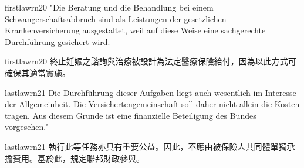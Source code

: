 \documentclass[12pt]{article}
\begin{document}
\begin{sourceboxpara}[title={原文理由 A.I.3 引文}]
\begin{lawboxpart}{first}{lawrn20}
"Die Beratung und die Behandlung bei einem Schwangerschaftsabbruch sind als Leistungen der gesetzlichen Krankenversicherung ausgestaltet, weil auf diese Weise eine sachgerechte Durchführung gesichert wird.
\end{lawboxpart}
\end{sourceboxpara}
\begin{transboxpara}
\begin{lawboxpart}{first}{lawrn20}
終止妊娠之諮詢與治療被設計為法定醫療保險給付，因為以此方式可確保其適當實施。
\end{lawboxpart}
\end{transboxpara}
\begin{sourceboxpara}
\begin{lawboxpart}{last}{lawrn21}
Die Durchführung dieser Aufgaben liegt auch wesentlich im Interesse der Allgemeinheit. Die Versichertengemeinschaft soll daher nicht allein die Kosten tragen. Aus diesem Grunde ist eine finanzielle Beteiligung des Bundes vorgesehen."
\end{lawboxpart}
\end{sourceboxpara}
\begin{transboxpara}
\begin{lawboxpart}{last}{lawrn21}
執行此等任務亦具有重要公益。因此，不應由被保險人共同體單獨承擔費用。基於此，規定聯邦財政參與。
\end{lawboxpart}
\end{transboxpara}
\end{document}
